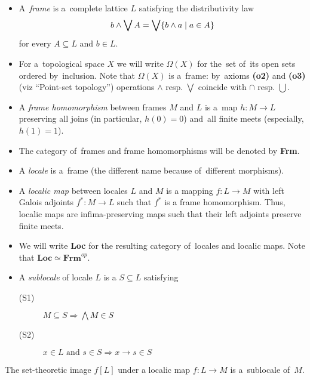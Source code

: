 \begin{itemize}
\item A~\emph{frame} is a~complete lattice $L$ satisfying the distributivity
law
\[
  b \wedge \bigvee A = \bigvee \{ b \wedge a \mid a\in A \}
\]
for every $A\subseteq L$ and $b\in L$.

\item For a~topological space $X$ we will write $\Omega(X)$ for the~set of~its
open sets ordered by~inclusion.
Note that $\Omega(X)$ is a~frame:
by~axioms {\bf (o2)} and {\bf (o3)} (viz ``Point-set topology'') operations
$\wedge$ resp. $\bigvee$ coincide with $\cap$ resp. $\bigcup$.

\item A \emph{frame homomorphism} between frames $M$ and $L$ is a~map $h\colon
M \to L$ preserving all joins (in particular, $h(0) = 0$) and~all finite meets
(especially, $h(1) = 1$).

\item The category of~frames and frame homomorphisms will be denoted by {\bf
Frm}.

\item A \emph{locale} is a~frame (the different name because of~different
morphisms).

\item A \emph{localic map} between locales $L$ and $M$ is a mapping $f\colon L
\to M$ with left Galois adjoints $f^*\colon M \to L$ such that $f^*$ is a frame
homomorphism.
Thus, localic maps are infima-preserving maps such that their left adjoints
preserve finite meets.

\item We will write {\bf Loc} for the resulting category of~locales and localic
maps.
Note that $\mathbf{Loc} \simeq \mathbf{Frm}^{op}$.

\item A \emph{sublocale} of locale $L$ is a $S\subseteq L$ satisfying
  \begin{description}
  \item[(S1)] $M\subseteq S \Longrightarrow \bigwedge M\in S$
  \item[(S2)] $x\in L \text{ and } s\in S \Longrightarrow x \rightarrow s \in S$ 
  \end{description}
\end{itemize}

\begin{fact}
  The set-theoretic image $f[L]$ under a localic map $f\colon L\to M$
  is a~sublocale of~$M$.
\end{fact}

